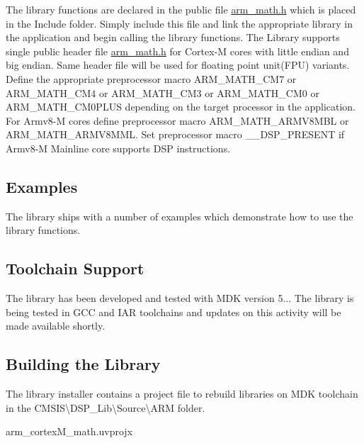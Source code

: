 The library functions are declared in the public file {\ttfamily \mbox{\hyperlink{arm__math_8h}{arm\+\_\+math.\+h}}} which is placed in the {\ttfamily Include} folder. Simply include this file and link the appropriate library in the application and begin calling the library functions. The Library supports single public header file {\ttfamily  \mbox{\hyperlink{arm__math_8h}{arm\+\_\+math.\+h}}} for Cortex-\/M cores with little endian and big endian. Same header file will be used for floating point unit(\+F\+P\+U) variants. Define the appropriate preprocessor macro A\+R\+M\+\_\+\+M\+A\+T\+H\+\_\+\+C\+M7 or A\+R\+M\+\_\+\+M\+A\+T\+H\+\_\+\+C\+M4 or A\+R\+M\+\_\+\+M\+A\+T\+H\+\_\+\+C\+M3 or A\+R\+M\+\_\+\+M\+A\+T\+H\+\_\+\+C\+M0 or A\+R\+M\+\_\+\+M\+A\+T\+H\+\_\+\+C\+M0\+P\+L\+US depending on the target processor in the application. For Armv8-\/M cores define preprocessor macro A\+R\+M\+\_\+\+M\+A\+T\+H\+\_\+\+A\+R\+M\+V8\+M\+BL or A\+R\+M\+\_\+\+M\+A\+T\+H\+\_\+\+A\+R\+M\+V8\+M\+ML. Set preprocessor macro \+\_\+\+\_\+\+D\+S\+P\+\_\+\+P\+R\+E\+S\+E\+NT if Armv8-\/M Mainline core supports D\+SP instructions.

\subsection*{Examples }

The library ships with a number of examples which demonstrate how to use the library functions.

\subsection*{Toolchain Support }

The library has been developed and tested with M\+DK version 5... The library is being tested in G\+CC and I\+AR toolchains and updates on this activity will be made available shortly.

\subsection*{Building the Library }

The library installer contains a project file to rebuild libraries on M\+DK toolchain in the {\ttfamily C\+M\+S\+IS\textbackslash{}D\+S\+P\+\_\+\+Lib\textbackslash{}Source\textbackslash{}A\+RM} folder.
\begin{DoxyItemize}
\item arm\+\_\+cortex\+M\+\_\+math.\+uvprojx
\end{DoxyItemize}

